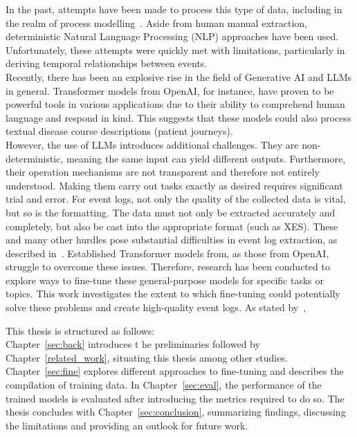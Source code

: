 In the past, attempts have been made to process this type of data, including in the realm of process modelling~\cite{friedrich_process_2011}. Aside from  human manual extraction,  deterministic Natural Language Processing (NLP) approaches have been used. Unfortunately, these attempts were quickly met with limitations, particularly in deriving temporal relationships between events.\\
Recently, there has been an explosive rise in the field of Generative AI and LLMs in general. Transformer models from OpenAI, for instance, have proven to be powerful tools in various applications due to their ability to comprehend human language and respond in kind. This suggests that these models could also process textual disease course descriptions (patient journeys).\\
However, the use of LLMs introduces additional challenges. They are non-deterministic, meaning the same input can yield different outputs. Furthermore, their operation mechanisms are not transparent and therefore not entirely understood. Making them carry out tasks exactly as desired requires significant trial and error. For event logs, not only the quality of the collected data is vital, but so is the formatting. The data must not only be extracted accurately and completely, but also be cast into the appropriate format (such as XES).
These and many other hurdles pose substantial difficulties in event log extraction, as described in~\cite{munoz-gama_process_2022}. Established Transformer models from, as those from OpenAI, struggle to overcome these issues. Therefore, research has been conducted to explore ways to fine-tune these general-purpose models for specific tasks or topics. This work investigates the extent to which fine-tuning could potentially solve these problems and create high-quality event logs. As stated by~\cite{latif_fine-tuning_2024}, 
\begin{quote}
\end{quote}

This thesis is structured as follows:\\
Chapter~\ref{sec:back} introduces t
he preliminaries followed by Chapter~\ref{related_work}, situating this thesis among other studies. Chapter~\ref{sec:fine} explores different approaches to fine-tuning and describes the compilation of training data. In Chapter~\ref{sec:eval}, the performance of the trained models is evaluated after introducing the metrics required to do so. The thesis concludes with Chapter~\ref{sec:conclusion}, summarizing findings, discussing the limitations and providing an outlook for future work.